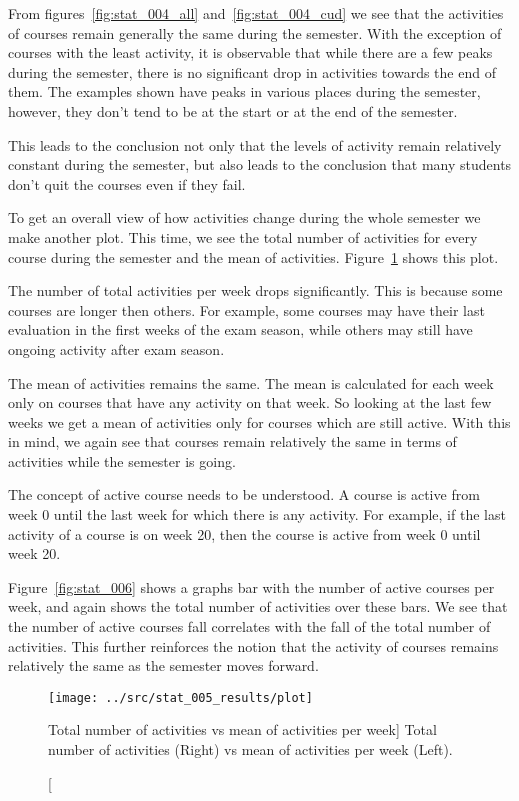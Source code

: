 From figures~\ref{fig:stat_004_all} and~\ref{fig:stat_004_cud} we see that the
activities of courses remain generally the same during the semester. With the
exception of courses with the least activity, it is observable that while there
are a few peaks during the semester, there is no significant drop in activities
towards the end of them. The examples shown have peaks in various places during
the semester, however, they don't tend to be at the start or at the end of the
semester.

This leads to the conclusion not only that the levels of activity remain
relatively constant during the semester, but also leads to the conclusion that
many students don't quit the courses even if they fail.

To get an overall view of how activities change during the whole semester we
make another plot. This time, we see the total number of activities for every
course during the semester and the mean of activities.
Figure~\ref{fig:stat_005} shows this plot.

The number of total activities per week drops significantly. This is because
some courses are longer then others. For example, some courses may have their
last evaluation in the first weeks of the exam season, while others may still
have ongoing activity after exam season.

The mean of activities remains the same. The mean is calculated for each week
only on courses that have any activity on that week. So looking at the last few
weeks we get a mean of activities only for courses which are still active. With
this in mind, we again see that courses remain relatively the same in terms of
activities while the semester is going.

The concept of active course needs to be understood. A course is active from
week 0 until the last week for which there is any activity. For example, if the
last activity of a course is on week 20, then the course is active from week 0
until week 20.

Figure~\ref{fig:stat_006} shows a graphs bar with the number of active courses
per week, and again shows the total number of activities over these bars. We
see that the number of active courses fall correlates with the fall of the
total number of activities. This further reinforces the notion that the
activity of courses remains relatively the same as the semester moves forward.

\begin{figure}[h!]
    \centering

    \texttt{[image: ../src/stat\_005\_results/plot]}

    \caption
        [Total number of activities vs mean of activities per week]
        {Total number of activities (Right) vs mean of activities per week
        (Left).}

    \label{fig:stat_005}
\end{figure}

